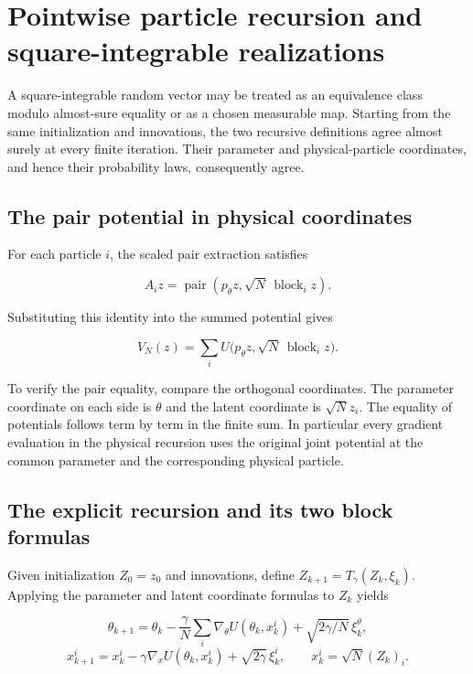 \documentclass[11pt,a4paper]{article}
\begin{document}
\section{\texorpdfstring{Pointwise particle recursion and square-integrable realizations}{Pointwise particle recursion and square-integrable realizations}}


A square-integrable random vector may be treated as an equivalence class modulo almost-sure equality or as a chosen measurable map. Starting from the same initialization and innovations, the two recursive definitions agree almost surely at every finite iteration. Their parameter and physical-particle coordinates, and hence their probability laws, consequently agree.



\subsection{\texorpdfstring{The pair potential in physical coordinates}{The pair potential in physical coordinates}}


For each particle \(i\), the scaled pair extraction satisfies

\[A_i z=\operatorname{pair}(p_\theta z,\sqrt N\,\operatorname{block}_i z).\]

Substituting this identity into the summed potential gives

\[V_N(z)=\sum_iU\bigl(p_\theta z,\sqrt N\,\operatorname{block}_iz\bigr).\]

To verify the pair equality, compare the orthogonal coordinates. The parameter coordinate on each side is \(\theta\) and the latent coordinate is \(\sqrt N z_i\). The equality of potentials follows term by term in the finite sum. In particular every gradient evaluation in the physical recursion uses the original joint potential at the common parameter and the corresponding physical particle.



\subsection{\texorpdfstring{The explicit recursion and its two block formulas}{The explicit recursion and its two block formulas}}


Given initialization \(Z_0=z_0\) and innovations, define \(Z_{k+1}=T_\gamma(Z_k,\xi_k)\). Applying the parameter and latent coordinate formulas to \(Z_k\) yields

\[\theta_{k+1}=\theta_k-\frac\gamma N\sum_i\nabla_\theta U(\theta_k,x_k^i)+\sqrt{2\gamma/N}\,\xi_k^\theta,\]\[x_{k+1}^i=x_k^i-\gamma\nabla_xU(\theta_k,x_k^i)+\sqrt{2\gamma}\,\xi_k^i,\qquad x_k^i=\sqrt N(Z_k)_i.\]
\end{document}
